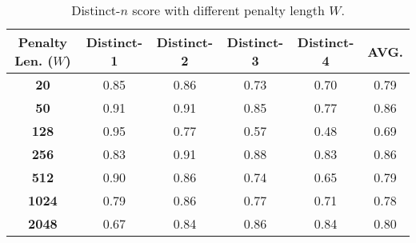 \begin{table}[ht]
    \renewcommand\arraystretch{1.2}
    \centering
    \small
    \caption{Distinct-$n$ score with different penalty length $W$.}
    \label{tab:distinctn_W}
    \vskip 0.15in
\begin{tabular}{c|cccc|c}
\toprule
\textbf{Penalty Len.} ($W$) & \textbf{Distinct-1} & \textbf{Distinct-2} & \textbf{Distinct-3} & \textbf{Distinct-4} & \textbf{AVG.} \\ \midrule
\textbf{20}                       & 0.85       & 0.86       & 0.73       & 0.70       & 0.79 \\
\textbf{50}                       & 0.91       & 0.91       & 0.85       & 0.77       & 0.86 \\
\textbf{128}                      & 0.95       & 0.77       & 0.57       & 0.48       & 0.69 \\
\textbf{256}                      & 0.83       & 0.91       & 0.88       & 0.83       & 0.86 \\
\textbf{512}                      & 0.90       & 0.86       & 0.74       & 0.65       & 0.79 \\
\textbf{1024}                     & 0.79       & 0.86       & 0.77       & 0.71       & 0.78 \\
\textbf{2048}                     & 0.67       & 0.84       & 0.86       & 0.84       & 0.80 \\ \bottomrule
\end{tabular}
\vskip -0.1in
\end{table}